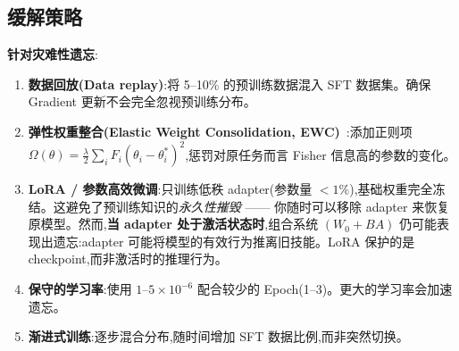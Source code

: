 \subsection{缓解策略}
\label{mitigation-strategies}

\textbf{针对灾难性遗忘}:

\begin{enumerate}
  \item \textbf{数据回放(Data replay)}:将 5--10\% 的预训练数据混入 SFT 数据集。确保 Gradient 更新不会完全忽视预训练分布。
  \item \textbf{弹性权重整合(Elastic Weight Consolidation, EWC)}~\cite{kirkpatrick2017overcoming}:添加正则项 $\Omega(\theta) = \frac{\lambda}{2}\sum_i F_i(\theta_i - \theta_i^*)^2$,惩罚对原任务而言 Fisher 信息高的参数的变化。
  \item \textbf{LoRA / 参数高效微调}:只训练低秩 adapter(参数量 $<1\%$),基础权重完全冻结。这避免了预训练知识的\emph{永久性摧毁} —— 你随时可以移除 adapter 来恢复原模型。然而,\textbf{当 adapter 处于激活状态时},组合系统 $(W_0 + BA)$ 仍可能表现出遗忘:adapter 可能将模型的有效行为推离旧技能。LoRA 保护的是 checkpoint,而非激活时的推理行为。
  \item \textbf{保守的学习率}:使用 $1$--$5 \times 10^{-6}$ 配合较少的 Epoch(1--3)。更大的学习率会加速遗忘。
  \item \textbf{渐进式训练}:逐步混合分布,随时间增加 SFT 数据比例,而非突然切换。
\end{enumerate}

